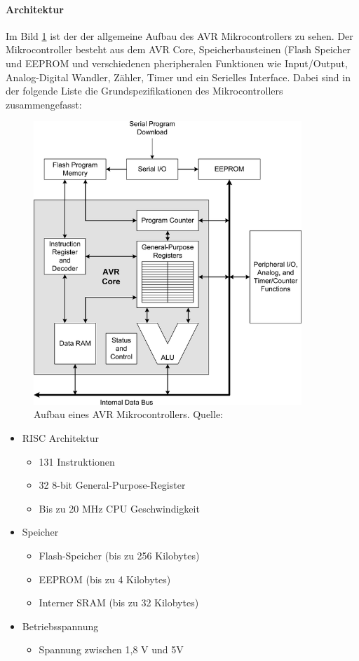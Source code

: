 \paragraph{Architektur}
Im Bild \ref{img:aufbauMikrocontroller} ist der der allgemeine Aufbau des AVR Mikrocontrollers zu sehen. Der Mikrocontroller besteht aus dem AVR Core, Speicherbausteinen (Flash Speicher und EEPROM und verschiedenen  pheripheralen Funktionen wie Input/Output, Analog-Digital Wandler, Zähler, Timer und ein Serielles Interface. Dabei sind in der folgende Liste die Grundspezifikationen des Mikrocontrollers zusammengefasst:
\begin{figure}
	\centering
	\includegraphics[width=0.9\textwidth]{bilder/aufbauMikrocontroller.png}
	\caption{Aufbau eines AVR Mikrocontrollers. Quelle: }
	\label{img:aufbauMikrocontroller}
\end{figure}
\begin{itemize}
\item RISC Architektur
\begin{itemize}
\item 131 Instruktionen
\item 32 8-bit General-Purpose-Register
\item Bis zu 20 MHz CPU Geschwindigkeit
\end{itemize}
\item Speicher
\begin{itemize}
\item Flash-Speicher (bis zu 256 Kilobytes)
\item EEPROM (bis zu 4 Kilobytes)
\item Interner SRAM (bis zu 32 Kilobytes)
\end{itemize}
\item Betriebsspannung
\begin{itemize}
\item Spannung zwischen 1,8 V und 5V
\end{itemize}
\end{itemize}
